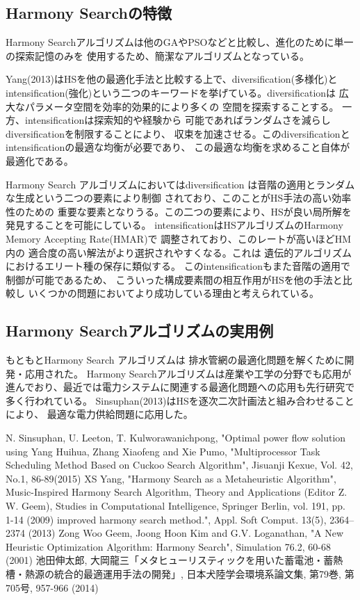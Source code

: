\documentclass[uplatex]{jsarticle}
\begin{document}
\subsection{Harmony Searchの特徴}
Harmony Searchアルゴリズムは他のGAやPSOなどと比較し、進化のために単一の探索記憶のみを
使用するため、簡潔なアルゴリズムとなっている。

Yang(2013)はHSを他の最適化手法と比較する上で、diversification(多様化)と
intensification(強化)という二つのキーワードを挙げている。diversificationは
広大なパラメータ空間を効率的効果的により多くの
空間を探索することする。
一方、intensificationは探索知的や経験から
可能であればランダムさを減らしdiversificationを制限することにより、
収束を加速させる。このdiversificationとintensificationの最適な均衡が必要であり、
この最適な均衡を求めること自体が最適化である。

Harmony Search アルゴリズムにおいてはdiversification
は音階の適用とランダムな生成という二つの要素により制御
されており、このことがHS手法の高い効率性のための
重要な要素となりうる。この二つの要素により、HSが良い局所解を
発見することを可能にしている。
intensificationはHSアルゴリズムのHarmony Memory Accepting Rate(HMAR)で
調整されており、このレートが高いほどHM内の
適合度の高い解法がより選択されやすくなる。これは
遺伝的アルゴリズムにおけるエリート種の保存に類似する。
このintensificationもまた音階の適用で制御が可能であるため、
こういった構成要素間の相互作用がHSを他の手法と比較し
いくつかの問題においてより成功している理由と考えられている。

\subsection{Harmony Searchアルゴリズムの実用例}
もともとHarmony Search アルゴリズムは
排水管網の最適化問題を解くために開発・応用された。
Harmony Searchアルゴリズムは産業や工学の分野でも応用が進んでおり、最近では電力システムに関連する最適化問題への応用も先行研究で多く行われている。
Sinsuphan(2013)はHSを逐次二次計画法と組み合わせることにより、
最適な電力供給問題に応用した。

\begin{thebibliography}{9}
 N. Sinsuphan, U. Leeton, T. Kulworawanichpong, "Optimal power flow solution using
 Yang Huihua, Zhang Xiaofeng and Xie Pumo, "Multiprocessor Task Scheduling Method Based on Cuckoo Search Algorithm", Jisuanji Kexue, Vol. 42, No.1, 86-89(2015)
 XS Yang, "Harmony Search as a Metaheuristic Algorithm", Music-Inspired Harmony Search Algorithm,  Theory and Applications (Editor Z. W. Geem), Studies in Computational Intelligence, Springer Berlin, vol. 191, pp. 1-14 (2009)
improved harmony search method.", Appl. Soft Comput. 13(5), 2364–2374 (2013)
 Zong Woo Geem, Joong Hoon Kim and G.V. Loganathan, "A New Heuristic Optimization Algorithm: Harmony Search", Simulation 76.2, 60-68 (2001)
 池田伸太郎, 大岡龍三「メタヒューリスティックを用いた蓄電池・蓄熱槽・熱源の統合的最適運用手法の開発」, 日本犬陸学会環境系論文集, 第79巻, 第705号, 957-966 (2014)
\end{thebibliography}
\end{document}
